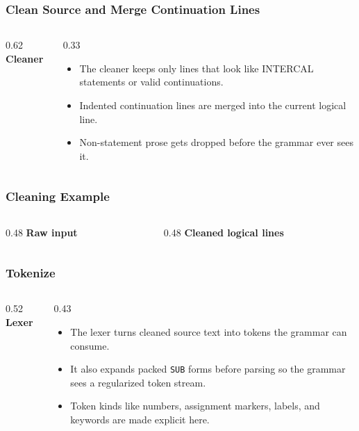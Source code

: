 \documentclass{beamer}
\begin{document}
\begin{frame}[fragile,shrink=8]
  \frametitle{Clean Source and Merge Continuation Lines}

  \begin{columns}[T]
    \begin{column}{0.62\textwidth}
      \textbf{Cleaner}

      
    \end{column}
    \begin{column}{0.33\textwidth}
      \begin{itemize}
        \item The cleaner keeps only lines that look like INTERCAL statements or valid continuations.
        \item Indented continuation lines are merged into the current logical line.
        \item Non-statement prose gets dropped before the grammar ever sees it.
      \end{itemize}
    \end{column}
  \end{columns}
\end{frame}

\begin{frame}[fragile,shrink=8]
  \frametitle{Cleaning Example}

  \begin{columns}[T]
    \begin{column}{0.48\textwidth}
      \textbf{Raw input}
      
    \end{column}
    \begin{column}{0.48\textwidth}
      \textbf{Cleaned logical lines}
      
    \end{column}
  \end{columns}
\end{frame}

\begin{frame}[fragile,shrink=5]
  \frametitle{Tokenize}

  \begin{columns}[T]
    \begin{column}{0.52\textwidth}
      \textbf{Lexer}

      
    \end{column}
    \begin{column}{0.43\textwidth}
      \begin{itemize}
        \item The lexer turns cleaned source text into tokens the grammar can consume.
        \item It also expands packed \texttt{SUB} forms before parsing so the grammar sees a regularized token stream.
        \item Token kinds like numbers, assignment markers, labels, and keywords are made explicit here.
      \end{itemize}
    \end{column}
  \end{columns}
\end{frame}
\end{document}
